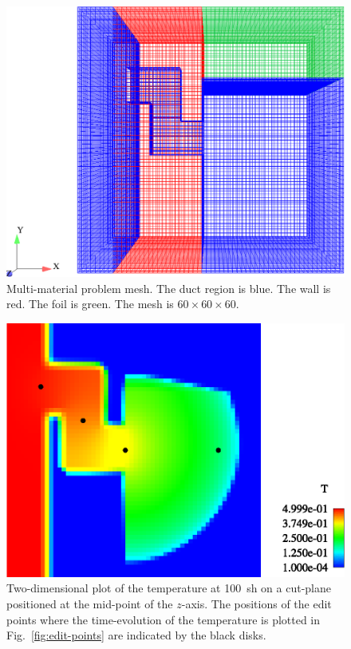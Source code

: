 \documentclass[preprint,12pt]{elsarticle}
\begin{document}
\begin{figure}[htpb!]
  \centerline{
    \includegraphics[width=5in,clip]{mesh.eps}}
  \caption{Multi-material problem mesh.  The duct region is blue.  The
    wall is red.  The foil is green.  The mesh is $60\times 60\times
    60$.}
  \label{fig:multi-mat-mesh}
\end{figure}

\begin{figure}[htpb!]
  \centerline{
    \includegraphics[width=5in,clip]{T_multi_mat.eps}}
  \caption{
    Two-dimensional plot of the temperature at 100~sh on a cut-plane
    positioned at the mid-point of the $z$-axis.  The positions of the
    edit points where the time-evolution of the temperature is plotted
    in Fig.~\ref{fig:edit-points} are indicated by the black disks.}
  \label{fig:multi-mat_T}
\end{figure}
\end{document}

